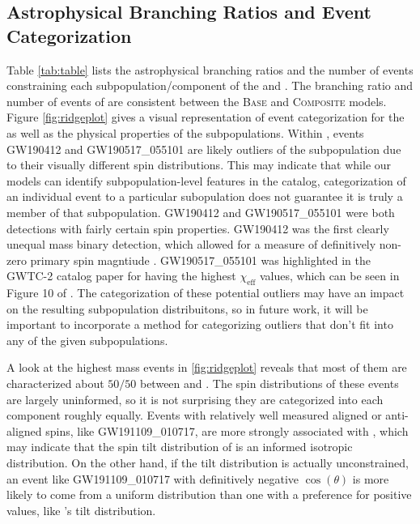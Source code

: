 \subsection{Astrophysical Branching Ratios and Event Categorization}

Table \ref{tab:table} lists the astrophysical branching ratios and the number of events constraining each subpopulation/component of the \base{} and \comp{}. The branching ratio and number of events of \first{} are consistent between the \textsc{Base} and \textsc{Composite} models. Figure \ref{fig:ridgeplot} gives a visual representation of event categorization for the \comp{} as well as the physical properties of the subpopulations. Within \contA{}, events GW190412 and GW190517\_055101 are likely outliers of the subpopulation due to their visually different spin distributions. This may indicate that while our models can identify subpopulation-level features in the catalog, categorization of an individual event to a particular subopulation does not guarantee it is truly a member of that subpopulation. GW190412 and GW190517\_055101 were both detections with fairly certain spin properties. GW190412 was the first clearly unequal mass binary detection, which allowed for a measure of definitively non-zero primary spin magntiude \citep{2010.14527}. GW190517\_055101 was highlighted in the GWTC-2 catalog paper \citet{2010.14527} for having the highest $\chi_\text{eff}$ values, which can be seen in Figure 10 of \citet{2010.14527}. The categorization of these potential outliers may have an impact on the resulting subpopulation distribuitons, so in future work, it will be important to incorporate a method for categorizing outliers that don't fit into any of the given subpopulations. 

A look at the highest mass events in \ref{fig:ridgeplot} reveals that most of them are characterized about $50/50$ between \contA{} and \contB{}. The spin distributions of these events are largely uninformed, so it is not surprising they are categorized into each component roughly equally. Events with relatively well measured aligned or anti-aligned spins, like GW191109\_010717, are more strongly associated with \contB{}, which may indicate that the spin tilt distribution of \contB{} is an informed isotropic distribution. On the other hand, if the tilt distribution is actually unconstrained, an event like GW191109\_010717 with definitively negative $\cos(\theta)$ is more likely to come from a uniform distribution than one with a preference for positive values, like \contA{}'s tilt distribution. 

